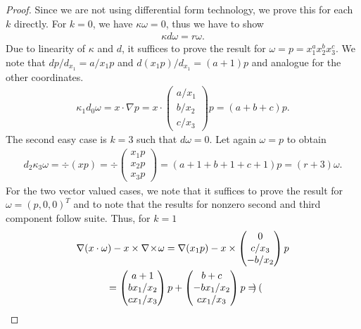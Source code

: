 \begin{proof}
  Since we are not using differential form technology, we prove this
  for each $k$ directly. For $k=0$, we have $\kappa\omega = 0$, thus
  we have to show
  \begin{gather*}
    \kappa d\omega = r\omega.
  \end{gather*}
  Due to linearity of $\kappa$ and $d$, it suffices to prove the
  result for $\omega = p=x_1^ax_2^bx_3^c$. We note that $dp/d_{x_1} =
  a/x_1 p$ and $d(x_1 p)/d_{x_1} = (a+1) p$ and analogue for the other
  coordinates.
  \begin{gather*}
    \kappa_1 d_0\omega = x\cdot \nabla p = x\cdot
    \begin{pmatrix}
      a/x_1\\b/x_2\\c/x_3
    \end{pmatrix}p
    = (a+b+c)p.
  \end{gather*}
  The second easy case is $k=3$ such that $d\omega = 0$. Let again
  $\omega = p$ to obtain
  \begin{gather*}
    d_2\kappa_3 \omega = \div(xp) = \div
    \begin{pmatrix}
      x_1 p \\x_2 p \\x_3 p
    \end{pmatrix}
    = (a+1+b+1+c+1) p = (r+3) \omega.
  \end{gather*}
  For the two vector valued cases, we note that it suffices to prove
  the result for $\omega = (p,0,0)^T$ and to note that the results for
  nonzero second and third component follow suite. Thus, for $k=1$
  \begin{multline*}
    \nabla (x\cdot \omega) - x\times \nabla\!\times\! \omega
    = \nabla(x_1 p) - x\times
    \begin{pmatrix}
      0\\c/x_3 \\ -b/x_2
    \end{pmatrix}p
    \\
    =
    \begin{pmatrix}
      a+1 \\ bx_1/x_2\\ cx_1/x_3
    \end{pmatrix}p
    +
    \begin{pmatrix}
      b+c \\ -bx_1/x_2\\cx_1/x_3
    \end{pmatrix}p
    =
    \begin{pmatrix}

\end{pmatrix}
\end{multline*}
\end{proof}
